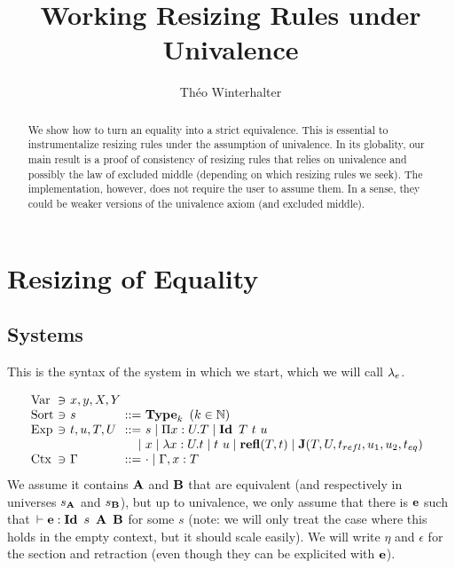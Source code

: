 \documentclass[a4paper,english]{lipics-utf8x}
\title{Working Resizing Rules under Univalence}
\author[1]{Théo Winterhalter}
\begin{document}
  \maketitle

  \begin{abstract}
    We show how to turn an equality into a strict equivalence. This is essential
    to instrumentalize resizing rules under the assumption of univalence.
    In its globality, our main result is a proof of consistency of resizing
    rules that relies on univalence and possibly the law of excluded middle
    (depending on which resizing rules we seek). The implementation, however,
    does not require the user to assume them. In a sense, they could be weaker
    versions of the univalence axiom (and excluded middle).
  \end{abstract}

  \section{Resizing of Equality}

  \subsection{Systems}

  This is the syntax of the system in which we start, which we will call
  $\lambda_e$.

  \[
    \begin{array}{l@{~}l@{~}l@{~}r@{~}l@{\quad}l}
      \Var  & \ni & x,y,X,Y \\
      \Sort & \ni & s             & ::= & \Type_k \mbox{ }
                                                (k \in \mathbb{N}) \\
      \Exp  & \ni & t,u,T,U & ::= & s \mid \Pi x:U.T \mid
                                    \Id T\ t\ u \\
                         &&& \mid & x \mid \lambda x:U.t \mid t~u
                               \mid \refl(T,t) \mid
                               \J (T,U,t_{refl},u_1,u_2,t_{eq}) \\
      \Ctx  & \ni & \Gamma  & ::= & \cdot \mid \Gamma, x:T \\
    \end{array}
  \]
  We assume it contains $\operatorname{\mathbf{A}}$ and $\operatorname{\mathbf{B}}$ that are equivalent (and respectively in
  universes $s_{\operatorname{\mathbf{A}}}$ and $s_{\operatorname{\mathbf{B}}}$), but up to univalence, we only assume that
  there is $\operatorname{\mathbf{e}}$ such that $\,\vdash \operatorname{\mathbf{e}} : \operatorname{\mathbf{Id}~} s\ \operatorname{\mathbf{A}}\ \operatorname{\mathbf{B}}$ for some $s$
  (note: we will only treat the case where this holds in the empty context,
  but it should scale easily).
  We will write $\eta$ and $\epsilon$ for the section and retraction (even
  though they can be explicited with $\operatorname{\mathbf{e}}$).
\end{document}
